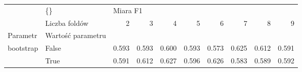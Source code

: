 \begin{tabular}{llrrrrrrrr}
\hline
          & \{\} & \multicolumn{8}{l}{Miara F1} \\
          & Liczba foldów &        2 &      3 &      4 &      5 &      6 &      7 &      8 &      9 \\
Parametr & Wartość parametru &          &        &        &        &        &        &        &        \\
\hline
bootstrap & False &    0.593 &  0.593 &  0.600 &  0.593 &  0.573 &  0.625 &  0.612 &  0.591 \\
          & True &    0.591 &  0.612 &  0.627 &  0.596 &  0.626 &  0.583 &  0.589 &  0.592 \\
\hline
\end{tabular}
